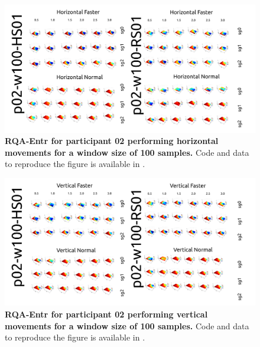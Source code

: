 \documentclass[12pt]{article}
\begin{document}
\newpage
\begin{figure}[ht!]
\centering
\includegraphics[scale=1.0]{figures/rqa/output/epsilons/rqa-epsilonsp02w100Horizontal}
    	\caption{
	{\bf RQA-Entr for participant 02 performing horizontal movements for a window size of 100 samples.}
	Code and data to reproduce the figure is available in \cite{srep2021}.
        }
    \label{fig-p02-H-w100}
\end{figure}
\begin{figure}[hb!]
\centering
\includegraphics[scale=1.0]{figures/rqa/output/epsilons/rqa-epsilonsp02w100Vertical}
    	\caption{
	{\bf RQA-Entr for participant 02 performing vertical movements for a window size of 100 samples.}
	Code and data to reproduce the figure is available in \cite{srep2021}.
        }
    \label{fig-p02-V-w100}
\end{figure}
\end{document}
